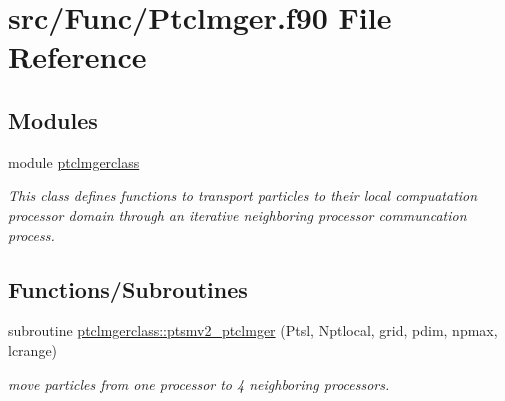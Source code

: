 \hypertarget{_ptclmger_8f90}{}\section{src/\+Func/\+Ptclmger.f90 File Reference}
\label{_ptclmger_8f90}
\subsection*{Modules}
\begin{DoxyCompactItemize}
\item 
module \mbox{\hyperlink{namespaceptclmgerclass}{ptclmgerclass}}
\begin{DoxyCompactList}\small\item\em This class defines functions to transport particles to their local compuatation processor domain through an iterative neighboring processor communcation process. \end{DoxyCompactList}\end{DoxyCompactItemize}
\subsection*{Functions/\+Subroutines}
\begin{DoxyCompactItemize}
\item 
subroutine \mbox{\hyperlink{namespaceptclmgerclass_a15bfd87febad22b6f820896f8720a3d7}{ptclmgerclass\+::ptsmv2\+\_\+ptclmger}} (Ptsl, Nptlocal, grid, pdim, npmax, lcrange)
\begin{DoxyCompactList}\small\item\em move particles from one processor to 4 neighboring processors. \end{DoxyCompactList}\end{DoxyCompactItemize}
